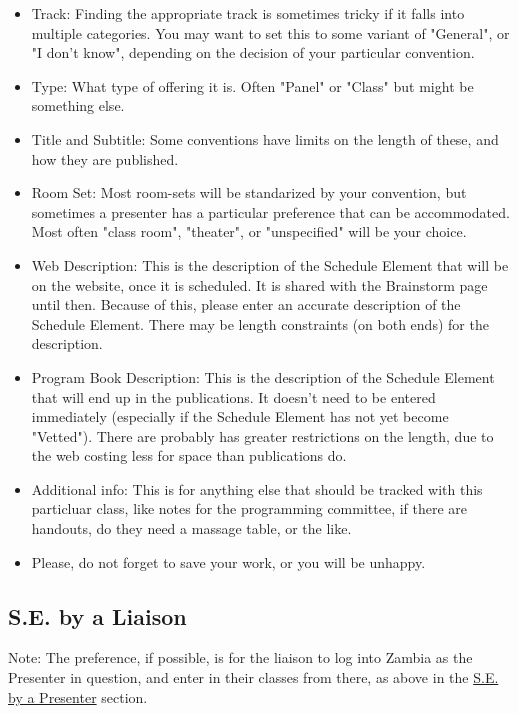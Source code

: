 \documentclass[captions=tablesignature]{scrartcl}
\begin{document}
\begin{itemize}
\item Track: Finding the appropriate track is sometimes tricky if it
falls into multiple categories.  You may want to set this to
some variant of "General", or "I don't know", depending on the
decision of your particular convention.

\item Type: What type of offering it is.  Often "Panel" or "Class" but
might be something else.

\item Title and Subtitle: Some conventions have limits on the length of
these, and how they are published.

\item Room Set: Most room-sets will be standarized by your convention,
but sometimes a presenter has a particular preference that can
be accommodated.  Most often "class room", "theater", or
"unspecified" will be your choice.

\item Web Description: This is the description of the Schedule Element
that will be on the website, once it is scheduled. It is shared
with the Brainstorm page until then. Because of this, please
enter an accurate description of the Schedule Element.  There may
be length constraints (on both ends) for the description.

\item Program Book Description: This is the description of the Schedule
Element that will end up in the publications.  It doesn't need to
be entered immediately (especially if the Schedule Element has
not yet become "Vetted"). There are probably has greater
restrictions on the length, due to the web costing less for space
than publications do.

\item Additional info: This is for anything else that should be tracked
with this particluar class, like notes for the programming
committee, if there are handouts, do they need a massage table,
or the like.

\item Please, do not forget to save your work, or you will be unhappy.
\end{itemize}
\subsection{S.E. by a Liaison}
\label{sec-5-3}
Note: The preference, if possible, is for the liaison to log into
Zambia as the Presenter in question, and enter in their classes
from there, as above in the \hyperref[sec-5-2]{S.E. by a Presenter} section.
\end{document}
